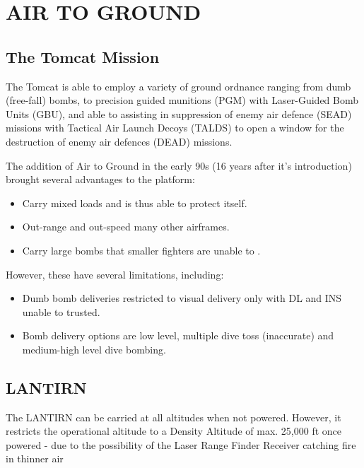 \section{AIR TO GROUND}

\subsection{The Tomcat Mission}

The Tomcat is able to employ a variety of ground ordnance ranging from dumb
(free-fall) bombs, to precision guided munitions (PGM) with Laser-Guided
Bomb Units (GBU), and able to assisting in suppression of enemy air defence
(SEAD) missions with Tactical Air Launch Decoys (TALDS) to open a window for
the destruction of enemy air defences (DEAD) missions.

The addition of Air to Ground in the early 90s (16 years after it's
introduction) brought several advantages to the platform:

\begin{itemize}

  \item Carry mixed loads and is thus able to protect itself.

  \item Out-range and out-speed many other airframes.

  \item Carry large bombs that smaller fighters are unable to .

\end{itemize}

However, these have several limitations, including:

\begin{itemize}

  \item Dumb bomb deliveries restricted to visual delivery only with DL and INS
    unable to trusted.

  \item Bomb delivery options are low level, multiple dive toss
    (inaccurate) and medium-high level dive bombing.

\end{itemize}

\subsection{LANTIRN}

The LANTIRN can be carried at all altitudes when not powered. However, it
restricts the operational altitude to a Density Altitude of max. 25,000 ft once
powered - due to the possibility of the Laser Range Finder Receiver catching
fire in thinner air

